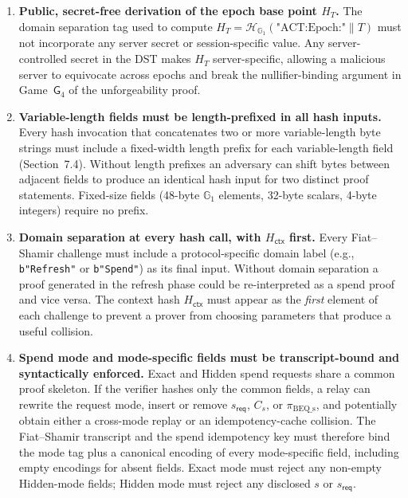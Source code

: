 \documentclass[11pt]{article}
\theoremstyle{definitionstyle}
\theoremstyle{plain}
\begin{document}
\begin{enumerate}[leftmargin=*,label=\textbf{C\arabic*.}]
\item \textbf{Public, secret-free derivation of the epoch base point $H_T$.}
  The domain separation tag used to compute $H_T = \mathcal{H}_{\mathbb{G}_1}(
  \text{"ACT:Epoch:"} \parallel T)$ must not incorporate any server secret
  or session-specific value.  Any server-controlled secret in the DST makes
  $H_T$ server-specific, allowing a malicious server to equivocate across
  epochs and break the nullifier-binding argument in Game~$\mathsf{G}_4$ of
  the unforgeability proof.

\item \textbf{Variable-length fields must be length-prefixed in all hash inputs.}
  Every hash invocation that concatenates two or more variable-length byte
  strings must include a fixed-width length prefix for each variable-length
  field (Section~7.4).  Without length prefixes an adversary can shift bytes
  between adjacent fields to produce an identical hash input for two distinct
  proof statements.  Fixed-size fields (48-byte $\mathbb{G}_1$ elements,
  32-byte scalars, 4-byte integers) require no prefix.

\item \textbf{Domain separation at every hash call, with $H_{\mathsf{ctx}}$ first.}
  Every Fiat--Shamir challenge must include a protocol-specific domain label
  (e.g., \texttt{b"Refresh"} or \texttt{b"Spend"}) as its final input.
  Without domain separation a proof generated in the refresh phase could be
  re-interpreted as a spend proof and vice versa.  The context hash
  $H_{\mathsf{ctx}}$ must appear as the \emph{first} element of each challenge
  to prevent a prover from choosing parameters that produce a useful collision.

\item \textbf{Spend mode and mode-specific fields must be transcript-bound and syntactically enforced.}
  Exact and Hidden spend requests share a common proof skeleton.  If the
  verifier hashes only the common fields, a relay can rewrite the request mode,
  insert or remove $s_{\mathsf{req}}$, $C_s$, or $\pi_{\text{BEQ\_s}}$, and
  potentially obtain either a cross-mode replay or an idempotency-cache
  collision.  The Fiat--Shamir transcript and the spend idempotency key must
  therefore bind the mode tag plus a canonical encoding of every mode-specific
  field, including empty encodings for absent fields.  Exact mode must reject
  any non-empty Hidden-mode fields; Hidden mode must reject any disclosed $s$
  or $s_{\mathsf{req}}$.


\end{enumerate}
\end{document}
